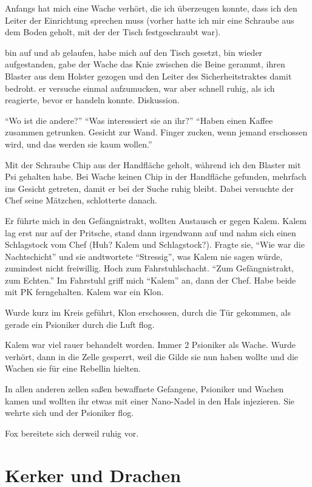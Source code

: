 \documentclass[11pt]{article}
\begin{document}
Anfangs hat mich eine Wache verhört, die ich überzeugen konnte, dass ich
den Leiter der Einrichtung sprechen muss (vorher hatte ich mir eine
Schraube aus dem Boden geholt, mit der der Tisch festgeschraubt war).

bin auf und ab gelaufen, habe mich auf den Tisch gesetzt, bin wieder
aufgestanden, gabe der Wache das Knie zwischen die Beine gerammt, ihren
Blaster aus dem Holster gezogen und den Leiter des Sicherheitstraktes
damit bedroht. er versuche einmal aufzumucken, war aber schnell ruhig,
als ich reagierte, bevor er handeln konnte. Diskussion.

``Wo ist die andere?'' ``Was interessiert sie an ihr?'' ``Haben einen
Kaffee zusammen getrunken. Gesicht zur Wand. Finger zucken, wenn jemand
erschossen wird, und das werden sie kaum wollen.''

Mit der Schraube Chip aus der Handfläche geholt, während ich den Blaster
mit Psi gehalten habe. Bei Wache keinen Chip in der Handfläche gefunden,
mehrfach ins Gesicht getreten, damit er bei der Suche ruhig bleibt.
Dabei versuchte der Chef seine Mätzchen, schlotterte danach.

Er führte mich in den Gefängnistrakt, wollten Austausch er gegen Kalem.
Kalem lag erst nur auf der Pritsche, stand dann irgendwann auf und nahm
sich einen Schlagstock vom Chef (Huh? Kalem und Schlagstock?). Fragte
sie, ``Wie war die Nachtschicht'' und sie andtwortete ``Stressig'', was
Kalem nie sagen würde, zumindest nicht freiwillig. Hoch zum
Fahrstuhlschacht. ``Zum Gefängnistrakt, zum Echten.'' Im Fahrstuhl griff
mich ``Kalem'' an, dann der Chef. Habe beide mit PK ferngehalten. Kalem
war ein Klon.

Wurde kurz im Kreis geführt, Klon erschossen, durch die Tür gekommen,
als gerade ein Psioniker durch die Luft flog.

Kalem war viel rauer behandelt worden. Immer 2 Psioniker als Wache.
Wurde verhört, dann in die Zelle gesperrt, weil die Gilde sie nun haben
wollte und die Wachen sie für eine Rebellin hielten.

In allen anderen zellen saßen bewaffnete Gefangene, Psioniker und Wachen
kamen und wollten ihr etwas mit einer Nano-Nadel in den Hals injezieren.
Sie wehrte sich und der Psioniker flog.

Fox bereitete sich derweil ruhig vor.

\section{Kerker und Drachen}
\end{document}
